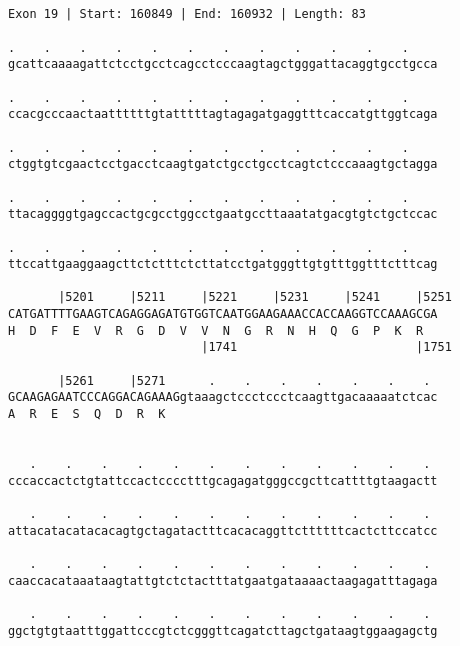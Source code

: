 \documentclass{article}
\begin{document}
\begin{Verbatim}
                                         
 
Exon 19 | Start: 160849 | End: 160932 | Length: 83
 
.    .    .    .    .    .    .    .    .    .    .    .    
gcattcaaaagattctcctgcctcagcctcccaagtagctgggattacaggtgcctgcca
                                                            
.    .    .    .    .    .    .    .    .    .    .    .    
ccacgcccaactaattttttgtatttttagtagagatgaggtttcaccatgttggtcaga
                                                            
.    .    .    .    .    .    .    .    .    .    .    .    
ctggtgtcgaactcctgacctcaagtgatctgcctgcctcagtctcccaaagtgctagga
                                                            
.    .    .    .    .    .    .    .    .    .    .    .    
ttacaggggtgagccactgcgcctggcctgaatgccttaaatatgacgtgtctgctccac
                                                            
.    .    .    .    .    .    .    .    .    .    .    .    
ttccattgaaggaagcttctctttctcttatcctgatgggttgtgtttggtttctttcag
                                                            
       |5201     |5211     |5221     |5231     |5241     |5251
CATGATTTTGAAGTCAGAGGAGATGTGGTCAATGGAAGAAACCACCAAGGTCCAAAGCGA
H  D  F  E  V  R  G  D  V  V  N  G  R  N  H  Q  G  P  K  R  
                           |1741                         |1751
  
       |5261     |5271      .    .    .    .    .    .    . 
GCAAGAGAATCCCAGGACAGAAAGgtaaagctccctccctcaagttgacaaaaatctcac
A  R  E  S  Q  D  R  K                                      
                                                            
  
   .    .    .    .    .    .    .    .    .    .    .    . 
cccaccactctgtattccactcccctttgcagagatgggccgcttcattttgtaagactt
                                                            
   .    .    .    .    .    .    .    .    .    .    .    . 
attacatacatacacagtgctagatactttcacacaggttcttttttcactcttccatcc
                                                            
   .    .    .    .    .    .    .    .    .    .    .    . 
caaccacataaataagtattgtctctactttatgaatgataaaactaagagatttagaga
                                                            
   .    .    .    .    .    .    .    .    .    .    .    . 
ggctgtgtaatttggattcccgtctcgggttcagatcttagctgataagtggaagagctg
                                                            

\end{Verbatim}
\end{document}
